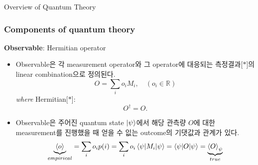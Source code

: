 \documentclass[9pt]{beamer}
\begin{document}
\begin{section}{Overview of Quantum Theory}
    \begin{frame}
        \frametitle{Components of quantum theory}
        \textbf{Observable}: Hermitian operator
        \vspace{0.3cm}
        \begin{itemize}
            \item Observable은 각 measurement operator와 그 operator에 대응되는 측정결과[$\ast$]의 linear combination으로 정의된다.
            $$ O = \sum_{i}o_i M_i,\quad (o_i \in \mathbb R)$$
            \textit{where} Hermitian[$\ast$]:
            $$ O^\dagger = O.$$
            \vspace{0.1cm}
            \item Observable은 주어진 quantum state $\ket \psi$에서 해당 관측량 $O$에 대한 measurement를 진행했을 때 얻을 수 잆는 outcome의 기댓값과 관계가 있다.
            $$ \underbrace{\braket{o}}_{empirical} = \sum_i o_i p(i) = \sum_i o_i \braket{\psi | M_i| \psi} = \braket{\psi | O | \psi} = \underbrace{\braket{O}_{\psi}}_{true}$$
        \end{itemize}
    \end{frame}
\end{section}
\end{document}
